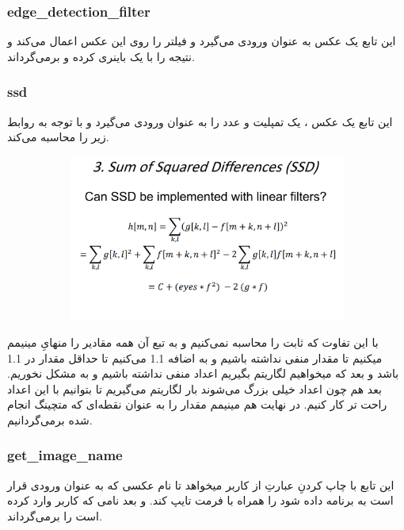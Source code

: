 \documentclass[a4paper,12pt]{article}
\begin{document}
  \subsubsection*{edge\_detection\_filter}
  این تابع یک عکس به عنوان ورودی می‌گیرد و فیلتر
  را روی این عکس اعمال می‌کند و نتیجه را با یک 
  باینری کرده و برمی‌گرداند.
  \subsubsection*{ssd}
  این تابع یک عکس ، یک تمپلیت و عدد 
  را به عنوان ورودی می‌گیرد و با توجه به روابط زیر 
  را محاسبه می‌کند.\\
  \begin{figure}[H]
  	\centering
  	\begin{subfigure}{0.9\textwidth}
  		\centering
  		\includegraphics[width=\textwidth]{1.png}
  	\end{subfigure}
  \end{figure}
با این تفاوت که ثابت 
را محاسبه نمی‌کنیم و به تبع آن همه مقادیر را منهایِ مینیمم میکنیم تا مقدار منفی نداشته باشیم و به اضافه 1.1 می‌کنیم تا حداقل مقدار در  
1.1 
باشد و بعد که میخواهیم لگاریتم بگیریم اعداد منفی نداشته باشیم و به مشکل نخوریم. بعد هم چون اعداد
 خیلی بزرگ می‌شوند 
 بار لگاریتم می‌گیریم تا بتوانیم با این اعداد راحت تر کار کنیم. در نهایت هم مینیمم مقدار 
 را به عنوان نقطه‌ای که متچینگ انجام شده برمی‌گردانیم.
 \subsubsection*{get\_image\_name}
 این تابع با چاپ کردنِ عبارتِ
 از کاربر میخواهد تا نام عکسی که به عنوان ورودی قرار است به برنامه داده شود را همراه با فرمت تایپ کند. و بعد نامی که کاربر وارد کرده است را برمی‌گرداند.
\end{document}
